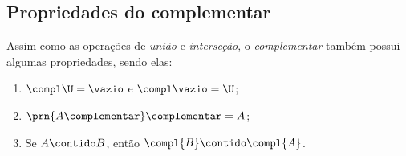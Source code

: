 \subsection{Propriedades do complementar}

Assim como as operações de \emph{união} e \emph{interseção}, o \emph{complementar} também possui algumas propriedades, sendo elas:

\begin{enumerate}
    \item
        \label{prop:complementar:universo}
        $\compl\U = \vazio$ e $\compl\vazio = \U$;
    \item
        \label{prop:complementar:complementar-do-complementar}
        $\prn{A\complementar}\complementar = A$;
    \item
        \label{prop:complementar:contrapositiva}
        Se $A \contido B$, então $\compl{B} \contido \compl{A}$.
\end{enumerate}